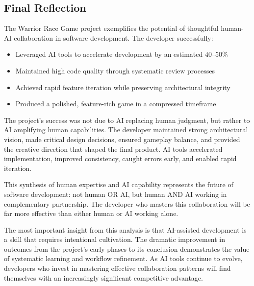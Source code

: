 \documentclass[12pt,a4paper]{article}
\begin{document}
\subsection{Final Reflection}

The Warrior Race Game project exemplifies the potential of thoughtful human-AI collaboration in software development. The developer successfully:

\begin{itemize}
    \item Leveraged AI tools to accelerate development by an estimated 40--50\%
    \item Maintained high code quality through systematic review processes
    \item Achieved rapid feature iteration while preserving architectural integrity
    \item Produced a polished, feature-rich game in a compressed timeframe
\end{itemize}

The project's success was not due to AI replacing human judgment, but rather to AI amplifying human capabilities. The developer maintained strong architectural vision, made critical design decisions, ensured gameplay balance, and provided the creative direction that shaped the final product. AI tools accelerated implementation, improved consistency, caught errors early, and enabled rapid iteration.

This synthesis of human expertise and AI capability represents the future of software development: not human OR AI, but human AND AI working in complementary partnership. The developer who masters this collaboration will be far more effective than either human or AI working alone.

The most important insight from this analysis is that AI-assisted development is a skill that requires intentional cultivation. The dramatic improvement in outcomes from the project's early phases to its conclusion demonstrates the value of systematic learning and workflow refinement. As AI tools continue to evolve, developers who invest in mastering effective collaboration patterns will find themselves with an increasingly significant competitive advantage.

\newpage
\end{document}
